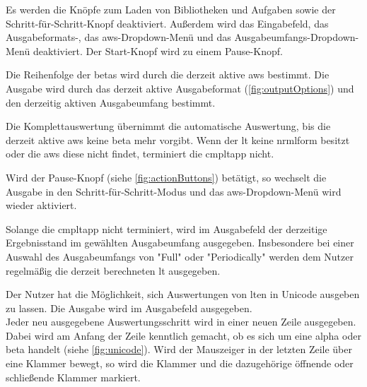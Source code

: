 \documentclass[parskip=full,11pt,twoside]{scrartcl}
\begin{document}
Es werden die Knöpfe zum Laden von Bibliotheken und Aufgaben sowie der Schritt-für-Schritt-Knopf deaktiviert.
Außerdem wird das Eingabefeld, das Ausgabeformats-, das \gls{aws}-Dropdown-Menü und das Ausgabeumfangs-Dropdown-Menü deaktiviert.
Der Start-Knopf wird zu einem Pause-Knopf.

Die Reihenfolge der \glspl{beta} wird durch die derzeit aktive \gls{aws} bestimmt. Die Ausgabe wird durch das derzeit aktive Ausgabeformat (\cref{fig:outputOptions}) und den derzeitig aktiven Ausgabeumfang bestimmt.

Die Komplettauswertung übernimmt die automatische Auswertung, bis die derzeit aktive \gls{aws} keine \gls{beta} mehr vorgibt.
Wenn der \gls{lt} keine \gls{nrmlform} besitzt oder die \gls{aws} diese nicht findet, terminiert die \gls{cmpltapp} nicht.

Wird der Pause-Knopf (siehe \cref{fig:actionButtons}) betätigt, so wechselt die Ausgabe in den Schritt-für-Schritt-Modus und das \gls{aws}-Dropdown-Menü wird wieder aktiviert.

Solange die \gls{cmpltapp} nicht terminiert, wird im Ausgabefeld der derzeitige Ergebnisstand im gewählten Ausgabeumfang ausgegeben. 
Insbesondere bei einer Auswahl des Ausgabeumfangs von "Full" oder "Periodically" werden dem Nutzer regelmäßig die derzeit berechneten \gls{lt} ausgegeben.

Der Nutzer hat die Möglichkeit, sich Auswertungen von \gls{lt}en in Unicode ausgeben zu lassen. Die Ausgabe wird im Ausgabefeld ausgegeben.\\
Jeder neu ausgegebene Auswertungsschritt wird in einer neuen Zeile ausgegeben. 
Dabei wird am Anfang der Zeile kenntlich gemacht, ob es sich um eine \gls{alpha} oder \gls{beta} handelt (siehe \cref{fig:unicode}).
Wird der Mauszeiger in der letzten Zeile über eine Klammer bewegt, so wird die Klammer und die dazugehörige öffnende oder schließende Klammer markiert.
\end{document}
